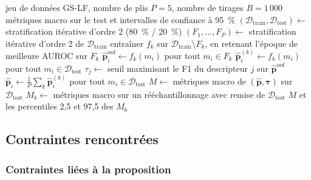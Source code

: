 \begin{algorithm}
   \caption{Protocole d'évaluation (d'après \cite{Han-2026})}
   \label{alg:Evaluation}
   \begin{algorithmic}[1]
      \REQUIRE jeu de données GS-LF, nombre de plis $P = 5$, nombre de tirages $B = 1\,000$
      \ENSURE métriques macro sur le test et intervalles de confiance à 95~\%
      \STATE $(\mathcal{D}_{\mathrm{train}}, \mathcal{D}_{\mathrm{test}}) \leftarrow$ stratification itérative d'ordre 2 (80~\% / 20~\%)
      \STATE $(F_1, \ldots, F_P) \leftarrow$ stratification itérative d'ordre 2 de $\mathcal{D}_{\mathrm{train}}$
         \STATE entraîner $f_k$ sur $\mathcal{D}_{\mathrm{train}} \setminus F_k$, en retenant l'époque de meilleure AUROC sur $F_k$
         \STATE $\hat{\mathbf{p}}^{\mathrm{oof}}_i \leftarrow f_k(m_i)$ pour tout $m_i \in F_k$
         \STATE $\hat{\mathbf{p}}^{(k)}_i \leftarrow f_k(m_i)$ pour tout $m_i \in \mathcal{D}_{\mathrm{test}}$
      \ENDFOR
         \STATE $\tau_j \leftarrow$ seuil maximisant le F1 du descripteur $j$ sur $\hat{\mathbf{p}}^{\mathrm{oof}}$ 
      \ENDFOR
      \STATE $\hat{\mathbf{p}}_i \leftarrow \frac{1}{P} \sum_{k} \hat{\mathbf{p}}^{(k)}_i$ pour tout $m_i \in \mathcal{D}_{\mathrm{test}}$ 
      \STATE $M \leftarrow$ métriques macro de $(\hat{\mathbf{p}}, \boldsymbol{\tau})$ sur $\mathcal{D}_{\mathrm{test}}$
         \STATE $M_b \leftarrow$ métriques macro sur un rééchantillonnage avec remise de $\mathcal{D}_{\mathrm{test}}$
      \ENDFOR
      \RETURN $M$ et les percentiles 2,5 et 97,5 des $M_b$
   \end{algorithmic}
\end{algorithm}

\subsection{Contraintes rencontrées}

\subsubsection{Contraintes liées à la proposition}

